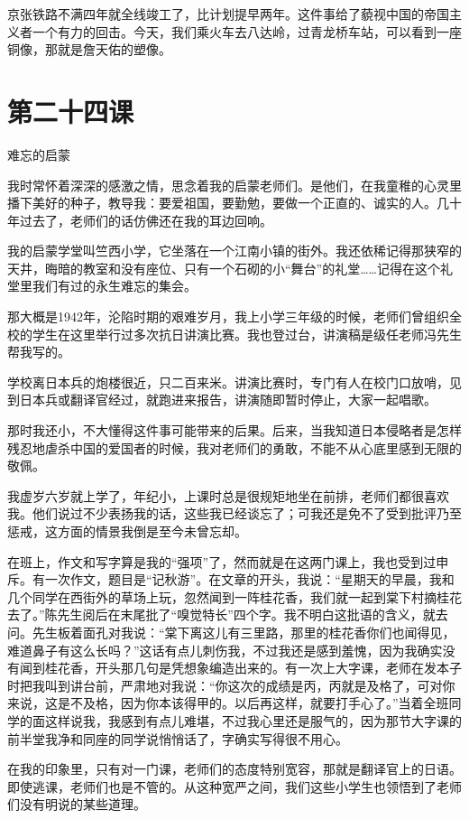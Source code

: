 \documentclass[12pt,UTF8]{ctexbook}
\begin{document}
京张铁路不满四年就全线竣工了，比计划提早两年。这件事给了藐视中国的帝国主义者一个有力的回击。今天，我们乘火车去八达岭，过青龙桥车站，可以看到一座铜像，那就是詹天佑的塑像。

\section{第二十四课}


难忘的启蒙

我时常怀着深深的感激之情，思念着我的启蒙老师们。是他们，在我童稚的心灵里播下美好的种子，教导我：要爱祖国，要勤勉，要做一个正直的、诚实的人。几十年过去了，老师们的话仿佛还在我的耳边回响。

我的启蒙学堂叫竺西小学，它坐落在一个江南小镇的街外。我还依稀记得那狭窄的天井，晦暗的教室和没有座位、只有一个石砌的小“舞台”的礼堂……记得在这个礼堂里我们有过的永生难忘的集会。

那大概是1942年，沦陷时期的艰难岁月，我上小学三年级的时候，老师们曾组织全校的学生在这里举行过多次抗日讲演比赛。我也登过台，讲演稿是级任老师冯先生帮我写的。

学校离日本兵的炮楼很近，只二百来米。讲演比赛时，专门有人在校门口放哨，见到日本兵或翻译官经过，就跑进来报告，讲演随即暂时停止，大家一起唱歌。

那时我还小，不大懂得这件事可能带来的后果。后来，当我知道日本侵略者是怎样残忍地虐杀中国的爱国者的时候，我对老师们的勇敢，不能不从心底里感到无限的敬佩。

我虚岁六岁就上学了，年纪小，上课时总是很规矩地坐在前排，老师们都很喜欢我。他们说过不少表扬我的话，这些我已经谈忘了；可我还是免不了受到批评乃至惩戒，这方面的情景我倒是至今未曾忘却。

在班上，作文和写字算是我的“强项”了，然而就是在这两门课上，我也受到过申斥。有一次作文，题目是“记秋游”。在文章的开头，我说：“星期天的早晨，我和几个同学在西街外的草场上玩，忽然闻到一阵桂花香，我们就一起到棠下村摘桂花去了。”陈先生阅后在末尾批了“嗅觉特长”四个字。我不明白这批语的含义，就去问。先生板着面孔对我说：“棠下离这儿有三里路，那里的桂花香你们也闻得见，难道鼻子有这么长吗？”这话有点儿刺伤我，不过我还是感到羞愧，因为我确实没有闻到桂花香，开头那几句是凭想象编造出来的。有一次上大字课，老师在发本子时把我叫到讲台前，严肃地对我说：“你这次的成绩是丙，丙就是及格了，可对你来说，这是不及格，因为你本该得甲的。以后再这样，就要打手心了。”当着全班同学的面这样说我，我感到有点儿难堪，不过我心里还是服气的，因为那节大字课的前半堂我净和同座的同学说悄悄话了，字确实写得很不用心。

在我的印象里，只有对一门课，老师们的态度特别宽容，那就是翻译官上的日语。即使逃课，老师们也是不管的。从这种宽严之间，我们这些小学生也领悟到了老师们没有明说的某些道理。
\end{document}
